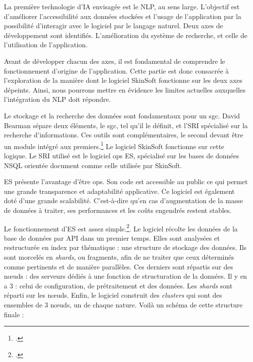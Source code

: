 
La première technologie d'\gls{IA} envisagée est le \gls{NLP}, au sens large. L'objectif est d'améliorer l'accessibilité aux données stockées et l'usage de l'application par la possibilité d'interagir avec le logiciel par le langage naturel. Deux axes de développement sont identifiés. L'amélioration du système de recherche, et celle de l'utilisation de l'application. 

Avant de développer chacun des axes, il est fondamental de comprendre le fonctionnement d'origine de l'application. Cette partie est donc consacrée à l'exploration de la manière dont le logiciel SkinSoft fonctionne sur les deux axes dépeints. Ainsi, nous pourrons mettre en évidence les limites actuelles auxquelles l'intégration du \gls{NLP} doit répondre.\newline

\label{SRI-ES} Le stockage et la recherche des données sont fondamentaux pour un \gls{sgc}. David Bearman sépare deux éléments, le \gls{sgc}, tel qu'il le définit, et l'\gls{SRI} spécialisé sur la recherche d'informations. Ces outils sont complémentaires, le second devant être un module intégré aux premiers.\footcite[p.43]{ArchivesMuseumInformatics} Le logiciel SkinSoft fonctionne sur cette logique. Le \gls{SRI} utilisé est le logiciel \gls{ops} \gls{ES}, spécialisé sur les bases de données \gls{NSQL} orientée document comme celle utilisée par SkinSoft. 

\gls{ES} présente l'avantage d'être \gls{ops}. Son code est accessible au public ce qui permet une grande transparence et adaptabilité applicative. Ce logiciel est également doté d'une grande scalabilité. C'est-à-dire qu'en cas d'augmentation de la masse de données à traiter, ses performances et les coûts engendrés restent stables. 

Le fonctionnement d'\gls{ES} est assez simple.\footcite{jvcInterrogezEfficacementVos2022}. Le logiciel récolte les données de la base de données par API dans un premier temps. Elles sont analysées et restructurée en index par thématique : une structure de stockage des données. Ils sont morcelés en \textit{shards}, ou fragments, afin de ne traiter que ceux déterminés comme pertinents et de manière parallèles. Ces derniers sont répartis sur des n\oe{uds} : des serveurs dédiés à une fonction de structuration de la données. Il y en a 3 : celui de configuration, de prétraitement et des données. Les \textit{shards} sont réparti sur les n\oe{uds}. Enfin, le logiciel construit des \textit{clusters} qui sont des ensembles de 3 n\oe{uds}, un de chaque nature. Voilà un schéma de cette structure finale : 

